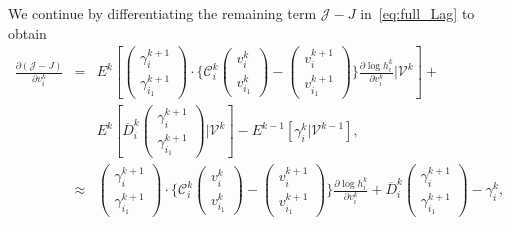 \documentclass[12pt,nopreprintline]{elsarticle}
\newcommand{\cC}{\mathcal C} \newcommand{\cD}{\mathcal D}
\begin{document}
We continue by differentiating the remaining term ${\mathcal J} - J$ in~\eqref{eq:full_Lag} 
to obtain
\begin{eqnarray}
\frac{\partial (\mathcal{J}-J)}{\partial v_i^k} 
&=&   E^{k}\left[  
\begin{pmatrix} \gamma_i^{k+1} \\ \gamma_{i_1}^{k+1} \end{pmatrix}  \cdot 
\bigg\{  \cC_i^k \begin{pmatrix}
v_i^{k} \\ v_{i_1}^{k}
\end{pmatrix}  - \begin{pmatrix}
v_i^{k+1} \\ v_{i_1}^{k+1}
\end{pmatrix}  \bigg\} 
   \frac{\partial \log h_i^k}{\partial v_i^k}  \Big| \mathcal{V}^k \right] 
   +  \nonumber  \\
&&     E^{k}\left[  \overline{D}_i^k \begin{pmatrix}
\gamma_i^{k+1} \\ \gamma_{i_1}^{k+1}
\end{pmatrix} \bigg | \mathcal{V}^k \right] -    E^{k-1} \left[  \gamma_i^k  | \mathcal{V}^{k-1}  \right], \nonumber \\ %
&\approx&
\begin{pmatrix} \gamma_i^{k+1} \\ \gamma_{i_1}^{k+1} \end{pmatrix}  \cdot 
\bigg\{  \cC_i^k \begin{pmatrix}
v_i^{k} \\ v_{i_1}^{k}
\end{pmatrix}  - \begin{pmatrix}
v_i^{k+1} \\ v_{i_1}^{k+1}
\end{pmatrix}  \bigg\} 
   \frac{\partial \log h_i^k}{\partial v_i^k}    
   +      \overline{D}_i^k \begin{pmatrix}
\gamma_i^{k+1} \\ \gamma_{i_1}^{k+1}
\end{pmatrix}  -      \gamma_i^k  , \label{eq:J_v_non_final} %
\end{eqnarray}
\end{document}
